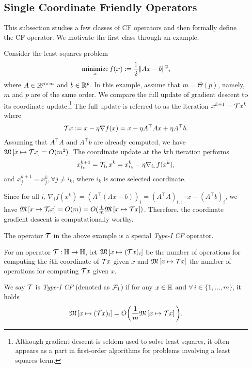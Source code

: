 \subsection{Single Coordinate Friendly Operators}
This subsection studies a few classes of CF operators and then formally define the CF operator. We motivate the first class through an example.
\begin{example}\label{ex:lsq1}
Consider the least squares problem
\begin{equation}
\Min_{x} f(x):=\frac{1}{2} \|A x - b\|^2,\label{lsq}
\end{equation}
where $A \in \mathbb{R}^{p \times m}$ and $b \in \mathbb{R}^p$. In this example, assume that $m=\Theta(p)$, namely, $m$ and $p$ are of the same order.  We compare the full update of gradient descent to its coordinate update.\footnote{Although gradient descent is seldom used to solve least squares, it often appears as a part in first-order algorithms for problems involving a least squares term.} 
The full update is referred to as the iteration
$x^{k+1}= {\mathcal{T}} x^k $ where
\begin{equation}
\cT x:=x-\eta\nabla f(x)=x-\eta A^\top Ax + \eta A^\top b.
\end{equation}
Assuming that $ A^\top A$ and $ A^\top b$ are already computed, we have $\mathfrak{M}\left[{x}\mapsto {{\mathcal{T}}x}\right]=O(m^2)$. The coordinate update at the $k$th iteration performs
$$x_{i_k}^{k+1}={\mathcal{T}}_{i_k} x^k =x^k_{i_k}-\eta\nabla_{i_k} f(x^k),$$
and $x_j^{k+1}=x_j^{k},\forall j\neq i_k$, where $i_k$ is some selected coordinate. 

Since for all $i$, $\nabla_i f(x^k)=\left(A^\top (Ax-b)\right)_{i}=(A^\top A)_{i,:}\cdot x-(A^\top b)_{i}$,
we have $\mathfrak{M}\left[{x}\mapsto {{\mathcal{T}}_i x }\right]=O(m)=O(\frac{1}{m}\mathfrak{M}\left[{x}\mapsto {{\mathcal{T}}x}\right])$. Therefore, the coordinate gradient descent is computationally worthy. 
\end{example}
The operator ${\mathcal{T}}$ in the above example is a special \emph{Type-I CF} operator.
\begin{definition}[Type-I CF]
For an operator ${\mathcal{T}}: \mathbb{H}\to\mathbb{H}$, let $\mathfrak{M}\left[{x}\mapsto {({\mathcal{T}}x)_i}\right]$ be the number of operations for computing the $i$th coordinate of ${\mathcal{T}} x$ given $x$ and $\mathfrak{M}\left[{x}\mapsto {{\mathcal{T}}x}\right]$ the number of operations for computing ${\mathcal{T}} x$ given $x$. 

We say ${\mathcal{T}}$ is \emph{Type-I CF} (denoted as ${\mathcal{F}}_1$) if for any $x\in\mathbb{H}$ and $\forall\, i\in\{1,\ldots,m\}$, it holds
$$\mathfrak{M}\left[{x}\mapsto {({\mathcal{T}}x)_i}\right]= O\bigg(\frac{1}{m}\mathfrak{M}\left[{x}\mapsto {{\mathcal{T}}x}\right]\bigg).$$
\end{definition}
